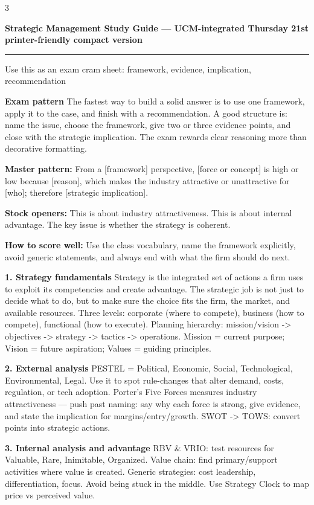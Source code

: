 \documentclass[7.6pt,letterpaper]{article}
\newcommand{\secbar}[1]{%
    \vspace{2pt}\noindent\textbf{#1}\par\vspace{1pt}\hrule\vspace{2pt}%
  }
\newcommand{\secbar}[1]{%
    \vspace{3pt}%
    \noindent\colorbox{navy}{\parbox{\dimexpr\linewidth-2\fboxsep}{%
      \fontsize{6.8pt}{8pt}\sffamily\bfseries\color{white}\strut\ #1\strut}}%
    \vspace{1pt}\par%
  }
\begin{document}
\begin{multicols}{3}

\secbar{Strategic Management Study Guide — UCM-integrated \textbullet{} Thursday 21st \textbullet{} printer-friendly compact version}
{\fontsize{6.0pt}{7pt}\selectfont
Use this as an exam cram sheet: framework, evidence, implication, recommendation
\par
\textbf{Exam pattern}
The fastest way to build a solid answer is to use one framework, apply it to the case, and finish with a recommendation. A good structure is: name the issue, choose the framework, give two or three evidence points, and close with the strategic implication. The exam rewards clear reasoning more than decorative formatting.
\par
\textbf{Master pattern:} From a [framework] perspective, [force or concept] is high or low because [reason], which makes the industry attractive or unattractive for [who]; therefore [strategic implication].
\par
\textbf{Stock openers:} This is about industry attractiveness. This is about internal advantage. The key issue is whether the strategy is coherent.
\par
\textbf{How to score well:} Use the class vocabulary, name the framework explicitly, avoid generic statements, and always end with what the firm should do next.
\par
\textbf{1. Strategy fundamentals}
Strategy is the integrated set of actions a firm uses to exploit its competencies and create advantage. The strategic job is not just to decide what to do, but to make sure the choice fits the firm, the market, and available resources. Three levels: corporate (where to compete), business (how to compete), functional (how to execute). Planning hierarchy: mission/vision -> objectives -> strategy -> tactics -> operations. Mission = current purpose; Vision = future aspiration; Values = guiding principles.
\par
\textbf{2. External analysis}
PESTEL = Political, Economic, Social, Technological, Environmental, Legal. Use it to spot rule-changes that alter demand, costs, regulation, or tech adoption. Porter's Five Forces measures industry attractiveness — push past naming: say why each force is strong, give evidence, and state the implication for margins/entry/growth. SWOT -> TOWS: convert points into strategic actions.
\par
\textbf{3. Internal analysis and advantage}
RBV & VRIO: test resources for Valuable, Rare, Inimitable, Organized. Value chain: find primary/support activities where value is created. Generic strategies: cost leadership, differentiation, focus. Avoid being stuck in the middle. Use Strategy Clock to map price vs perceived value.
}
\end{multicols}
\end{document}
